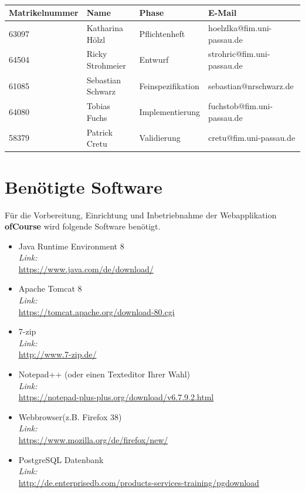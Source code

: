 \documentclass[a4paper, 12pt]{scrreprt}
\begin{document}
\begin{titlepage}
\begin{center}
			\ \\
        \begin{tabular}{ | l | l | l | l |}
        	\hline
        	\textbf{Matrikelnummer} & \textbf{Name} & \textbf{Phase} & \textbf{E-Mail}  \\ \hline
        	63097 & Katharina Hölzl & Pflichtenheft & hoelzlka@fim.uni-passau.de \\ \hline
        	64504 & Ricky Strohmeier& Entwurf & strohric@fim.uni-passau.de  \\ \hline
        	61085 & Sebastian Schwarz & Feinspezifikation & sebastian@nrschwarz.de \\ \hline 
        	64080 & Tobias Fuchs & Implementierung  &  fuchstob@fim.uni-passau.de\\ \hline
        	58379 & Patrick Cretu  &  Validierung & cretu@fim.uni-passau.de \\ \hline
        \end{tabular}
        
      
       
        
        
    \end{center}
\end{titlepage}


\tableofcontents
\chapter{Benötigte Software}
Für die Vorbereitung, Einrichtung und Inbetriebnahme der Webapplikation \textbf{ofCourse} wird folgende Software benötigt.
\begin{itemize}
	\item Java Runtime Environment 8\\
	{\it Link:\\} \url{https://www.java.com/de/download/}
	\item Apache Tomcat 8\\
	{\it Link:\\} \url{https://tomcat.apache.org/download-80.cgi}
	\item 7-zip\\
	{\it Link:\\} \url{http://www.7-zip.de/}
	\item Notepad++ (oder einen Texteditor Ihrer Wahl)\\
	{\it Link:\\} \url{https://notepad-plus-plus.org/download/v6.7.9.2.html}
	\item Webbrowser(z.B. Firefox 38)\\
	{\it Link:\\} \url{https://www.mozilla.org/de/firefox/new/}
	\item PostgreSQL Datenbank\\
	{\it Link:\\} \url{http://de.enterprisedb.com/products-services-training/pgdownload}
\end{itemize}
\end{document}
